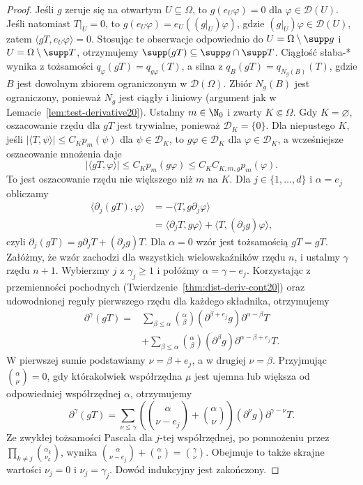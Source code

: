 \begin{proof}
Jeśli $g$ zeruje się na otwartym $U\subseteq\Omega$, to
$g(e_U\varphi)=0$ dla $\varphi\in\mathcal D(U)$.
Jeśli natomiast $T|_U=0$, to
$g(e_U\varphi)=e_U((g|_U)\varphi)$, gdzie
$(g|_U)\varphi\in\mathcal D(U)$, zatem
$\langle gT,e_U\varphi\rangle=0$.
Stosując te obserwacje odpowiednio do
$U=\Omega\setminus\supp g$ i $U=\Omega\setminus\supp T$,
otrzymujemy $\supp(gT)\subseteq\supp g\cap\supp T$.
Ciągłość słaba-* wynika z tożsamości
$q_\varphi(gT)=q_{g\varphi}(T)$, a silna z
$q_B(gT)=q_{N_g(B)}(T)$, gdzie $B$ jest dowolnym zbiorem
ograniczonym w $\mathcal D(\Omega)$.
Zbiór $N_g(B)$ jest ograniczony, ponieważ $N_g$ jest
ciągły i liniowy (argument jak w Lemacie~\ref{lem:test-derivative20}).
Ustalmy $m\in\N_0$ i zwarty $K\Subset\Omega$.
Gdy $K=\varnothing$, oszacowanie rzędu dla $gT$ jest
trywialne, ponieważ $\mathcal D_K=\{0\}$.
Dla niepustego $K$, jeśli
$|\langle T,\psi\rangle|\le C_Kp_m(\psi)$
dla $\psi\in\mathcal D_K$, to $g\varphi\in\mathcal D_K$
dla $\varphi\in\mathcal D_K$, a wcześniejsze oszacowanie
mnożenia daje
\[
 |\langle gT,\varphi\rangle|
 \le C_Kp_m(g\varphi)
 \le C_K C_{K,m,g}p_m(\varphi).
\]
To jest oszacowanie rzędu nie większego niż $m$ na $K$.
Dla $j\in\{1,\ldots,d\}$ i $\alpha=e_j$ obliczamy
\[
 \begin{aligned}
 \langle\partial_j(gT),\varphi\rangle
 &=-\langle T,g\partial_j\varphi\rangle\\
 &=\langle\partial_jT,g\varphi\rangle
   +\langle T,(\partial_jg)\varphi\rangle,
 \end{aligned}
\]
czyli $\partial_j(gT)=g\partial_jT+(\partial_jg)T$.
Dla $\alpha=0$ wzór jest tożsamością $gT=gT$.
Załóżmy, że wzór zachodzi dla wszystkich wielowskaźników
rzędu $n$, i ustalmy $\gamma$ rzędu $n+1$.
Wybierzmy $j$ z $\gamma_j\ge1$ i połóżmy $\alpha=\gamma-e_j$.
Korzystając z przemienności pochodnych
(Twierdzenie~\ref{thm:dist-deriv-cont20}) oraz udowodnionej
reguły pierwszego rzędu dla każdego składnika, otrzymujemy
\[
\begin{aligned}
\partial^\gamma(gT)
={}&\sum_{\beta\le\alpha}\binom\alpha\beta
(\partial^{\beta+e_j}g)\partial^{\alpha-\beta}T\\
&+\sum_{\beta\le\alpha}\binom\alpha\beta
(\partial^\beta g)\partial^{\alpha-\beta+e_j}T.
\end{aligned}
\]
W pierwszej sumie podstawiamy $\nu=\beta+e_j$, a w drugiej
$\nu=\beta$. Przyjmując $\binom\alpha\mu=0$, gdy którakolwiek
współrzędna $\mu$ jest ujemna lub większa od odpowiedniej
współrzędnej $\alpha$, otrzymujemy
\[
\partial^\gamma(gT)=\sum_{\nu\le\gamma}
\left(\binom\alpha{\nu-e_j}+\binom\alpha\nu\right)
(\partial^\nu g)\partial^{\gamma-\nu}T.
\]
Ze zwykłej tożsamości Pascala dla $j$-tej współrzędnej,
po pomnożeniu przez $\prod_{k\ne j}\binom{\alpha_k}{\nu_k}$,
wynika $\binom\alpha{\nu-e_j}+\binom\alpha\nu=\binom\gamma\nu$.
Obejmuje to także skrajne wartości $\nu_j=0$ i $\nu_j=\gamma_j$.
Dowód indukcyjny jest zakończony.
\end{proof}

